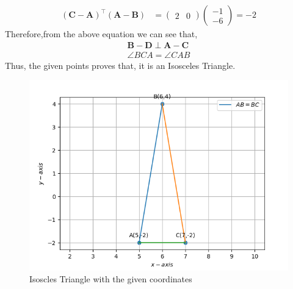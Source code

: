 \documentclass[12pt]{article}
\newcommand{\myvec}[1]{\ensuremath{\begin{pmatrix}#1\end{pmatrix}}}
\let\vec\mathbf
\begin{document}
\begin{enumerate}
\begin{align}
	(\vec{C}-\vec{A})^\top (\vec{A}-\vec{B}) &= \myvec{2&0} \myvec{-1\\-6} = -2	
	\end{align}
    Therefore,from the above equation we can see that,
	\begin{align}
 {\vec{B} -\vec{D}}\perp {\vec{A} -\vec{C}}\\
	\angle BCA = \angle CAB   
	\end{align}    	
Thus, the given points proves that, it is an Isosceles Triangle.
\begin{figure}[!h]
	\begin{center} 
	    \includegraphics[width=\columnwidth]{figs/Vector2.png}
	\end{center}
\caption{Isoscles Triangle with the given coordinates}
\label{fig:Fig}
\end{figure}
\end{enumerate}
\end{document}
